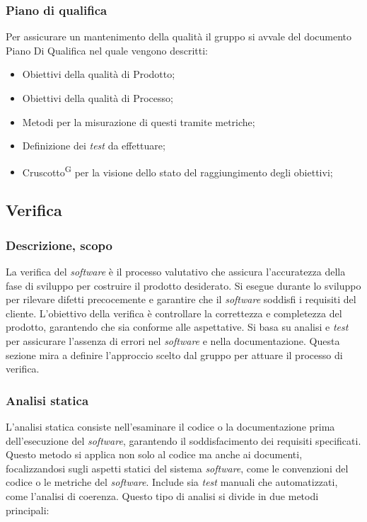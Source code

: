 \documentclass[5pt]{article}
\begin{document}
    \subsubsection{Piano di qualifica}
    Per assicurare un mantenimento della qualità il gruppo si avvale del documento Piano Di Qualifica nel quale vengono descritti:
    \begin{itemize}
		\item Obiettivi della qualità di Prodotto;
		\item Obiettivi della qualità di Processo;
		\item Metodi per la misurazione di questi tramite metriche;
		\item Definizione dei \textit{test} da effettuare;
		\item Cruscotto\textsuperscript{G} per la visione dello stato del raggiungimento degli obiettivi;
    \end{itemize}

\subsection{Verifica}
    \subsubsection{Descrizione, scopo}
    La verifica del \textit{software} è il processo valutativo che assicura l'accuratezza della fase di sviluppo per costruire il prodotto desiderato. Si esegue durante lo sviluppo per rilevare difetti precocemente e garantire che il \textit{software} soddisfi i requisiti del cliente. L'obiettivo della verifica è controllare la correttezza e completezza del prodotto, garantendo che sia conforme alle aspettative. Si basa su analisi e \textit{test} per assicurare l'assenza di errori nel \textit{software} e nella documentazione. Questa sezione mira a definire l'approccio scelto dal gruppo per attuare il processo di verifica.
    \subsubsection{Analisi statica}
    L'analisi statica consiste nell'esaminare il codice o la documentazione prima dell'esecuzione del \textit{software}, garantendo il soddisfacimento dei requisiti specificati. Questo metodo si applica non solo al codice ma anche ai documenti, focalizzandosi sugli aspetti statici del sistema \textit{software}, come le convenzioni del codice o le metriche del \textit{software}. Include sia \textit{test} manuali che automatizzati, come l'analisi di coerenza.
    Questo tipo di analisi si divide in due metodi principali: 
\end{document}
